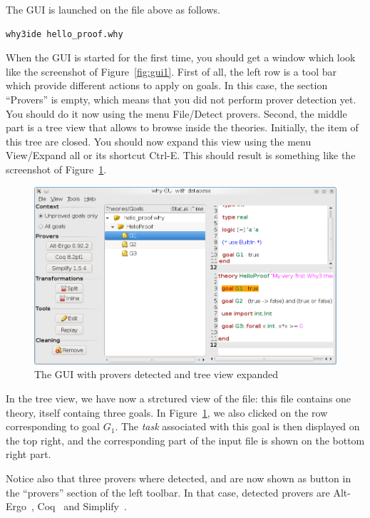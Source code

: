 The GUI is launched on the file above as follows.
\begin{verbatim}
why3ide hello_proof.why
\end{verbatim}
When the GUI is started for the first time, you should get a window
which look like the screenshot of Figure~\ref{fig:gui1}. First of all,
the left row is a tool bar which provide different actions to apply on
goals. In this case, the section ``Provers'' is empty, which means
that you did not perform prover detection yet. You should do it now
using the menu \textsf{File/Detect provers}. Second, the middle part
is a tree view that allows to browse inside the theories. Initially,
the item of this tree are closed. You should now expand this view
using the menu \textsf{View/Expand all} or its shortcut
\textsf{Ctrl-E}. This should result is something like the screenshot of Figure~\ref{fig:gui2}.

\begin{figure}[tbp]
  \includegraphics[width=\textwidth]{gui2.png}
  \caption{The GUI with provers detected and tree view expanded}
  \label{fig:gui2}
\end{figure}

In the tree view, we have now a strctured view of the file: this file
contains one theory, itself containg three goals. In
Figure~\ref{fig:gui2}, we also clicked on the row corresponding to
goal $G_1$. The \emph{task} associated with this goal is then
displayed on the top right, and the corresponding part of the input
file is shown on the bottom right part.

Notice also that three provers where detected, and are now shown as
button in the ``provers'' section of the left toolbar. In that case,
detected provers are Alt-Ergo~\cite{ergo}, Coq~\cite{CoqArt} and
Simplify~\cite{simplify05}. 

